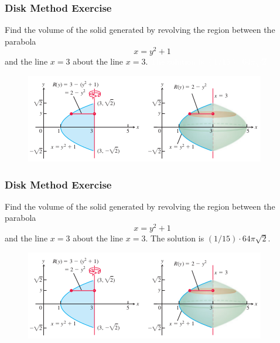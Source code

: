 \documentclass[xcolor=dvipsnames]{beamer}
\begin{document}
\begin{frame}
  \frametitle{Disk Method Exercise}
{\ubung} Find the volume of the solid generated by revolving the
region between the parabola 
\begin{equation}
  \label{eq:raejibei}
  x=y^{2}+1
\end{equation}
and the line $x=3$ about the line $x=3$. \textcolor{white}{The solution is $(1/15)\cdot{}64\pi\sqrt{2}$.}
\begin{figure}[h]
  \includegraphics[scale=0.7]{./diagrams/revthr.png}
\end{figure}
\end{frame}

\addtocounter{exercise}{-1}
\addtocounter{equation}{-1}

\begin{frame}
  \frametitle{Disk Method Exercise}
{\ubung} Find the volume of the solid generated by revolving the
region between the parabola 
\begin{equation}
  \label{eq:ebaikeiw}
  x=y^{2}+1
\end{equation}
and the line $x=3$ about the line $x=3$. The solution is $(1/15)\cdot{}64\pi\sqrt{2}$.
\begin{figure}[h]
  \includegraphics[scale=0.7]{./diagrams/revthr.png}
\end{figure}
\end{frame}
\end{document}
